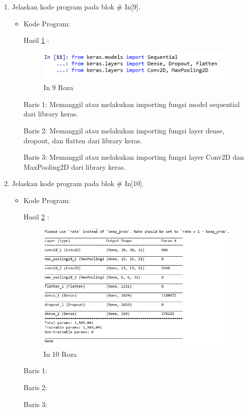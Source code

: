 \begin{enumerate}
\item Jelaskan kode program pada blok \# In[9].
\begin{itemize}
\item Kode Program:

\par Hasil \ref{in9roza} :
\begin{figure}[!hbtp]
\centering
\includegraphics[scale=0.7]{figures/prak9roza.png}
\caption{In 9 Roza}
\label{in9roza}
\end{figure}
\par Baris 1: Memanggil atau melakukan importing fungsi model sequential dari library keras.
\par Baris 2: Memanggil atau melakukan importing fungsi layer dense, dropout, dan flatten dari library keras.
\par Baris 3: Memanggil atau melakukan importing fungsi layer Conv2D dan MaxPooling2D dari library keras.
\end{itemize}
\par

\item Jelaskan kode program pada blok \# In[10].
\begin{itemize}
\item Kode Program:

\par Hasil \ref{in10roza} :
\begin{figure}[!hbtp]
\centering
\includegraphics[scale=0.7]{figures/prak10roza.png}
\caption{In 10 Roza}
\label{in10roza}
\end{figure}
\par Baris 1: 
\par Baris 2:
\par Baris 3:
\end{itemize}
\par


\end{enumerate}
